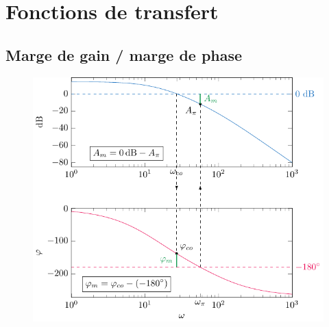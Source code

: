 \documentclass[resume]{subfiles}
\begin{document}
\section{Fonctions de transfert}
\subsection{Marge de gain / marge de phase}
\begin{figure}[H]
\centering
\includegraphics[scale=1]{drwg_4.pdf}
\end{figure}
\end{document}
